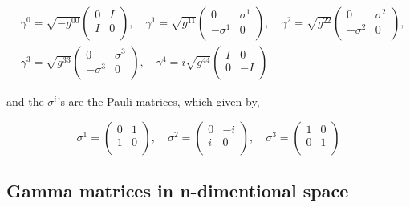 \begin{align}
   &\gamma^0 = \sqrt{-g^{00}} \begin{pmatrix} 0 & I \\ I & 0 \\ \end{pmatrix}, \quad
   \gamma^1 = \sqrt{g^{11}} \begin{pmatrix} 0 & \sigma^1 \\ -\sigma^1 & 0 \\ \end{pmatrix}, \quad
   \gamma^2 = \sqrt{g^{22}} \begin{pmatrix} 0 & \sigma^2 \\ -\sigma^2 & 0 \\ \end{pmatrix}, \nonumber\\
   &\gamma^3 = \sqrt{g^{33}} \begin{pmatrix} 0 & \sigma^3 \\ -\sigma^3 & 0 \\ \end{pmatrix}, \quad
   \gamma^4 = i\sqrt{g^{44}} \begin{pmatrix} I & 0 \\ 0 & -I \\ \end{pmatrix}
\end{align}

and the $\sigma^i$'s are the Pauli matrices, which given by,

\begin{equation}
   \sigma^1 = \begin{pmatrix} 0 & 1 \\ 1 & 0 \\ \end{pmatrix}, \quad
   \sigma^2 = \begin{pmatrix} 0 &-i \\ i & 0 \\ \end{pmatrix}, \quad
   \sigma^3 = \begin{pmatrix} 1 & 0 \\ 0 & 1 \\ \end{pmatrix}
\end{equation}

\subsection{Gamma matrices in n-dimentional space}

